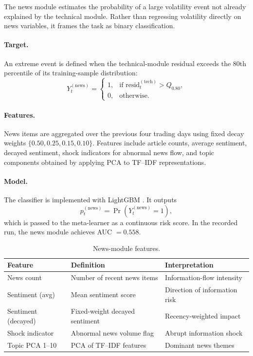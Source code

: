 \documentclass[review]{elsarticle}
\begin{document}
The news module estimates the probability of a large volatility event not already explained by the technical module. Rather than regressing volatility directly on news variables, it frames the task as binary classification.

\paragraph{Target.}
An extreme event is defined when the technical-module residual exceeds the 80th percentile of its training-sample distribution:
\begin{equation}\label{eq:news-target}
Y_t^{(\text{news})} =
\begin{cases}
1, & \text{if } \text{resid}_{t}^{(\text{tech})} > Q_{0.80}, \\
0, & \text{otherwise}.
\end{cases}
\end{equation}

\paragraph{Features.}
News items are aggregated over the previous four trading days using fixed decay weights $\{0.50,0.25,0.15,0.10\}$. Features include article counts, average sentiment, decayed sentiment, shock indicators for abnormal news flow, and topic components obtained by applying PCA to TF--IDF representations.

\paragraph{Model.}
The classifier is implemented with LightGBM \cite{ke2017}. It outputs
\[
p_t^{(\text{news})} = \Pr\!\left(Y_t^{(\text{news})}=1\right),
\]
which is passed to the meta-learner as a continuous risk score. In the recorded run, the news module achieves AUC $=0.558$.

\begin{table}[t]
\centering
\caption{News-module features.}
\label{tab:news-features}
\begin{tabular}{lll}
\hline
Feature & Definition & Interpretation \\\hline
News count & Number of recent news items & Information-flow intensity \\
Sentiment (avg) & Mean sentiment score & Direction of information risk \\
Sentiment (decayed) & Fixed-weight decayed sentiment & Recency-weighted impact \\
Shock indicator & Abnormal news volume flag & Abrupt information shock \\
Topic PCA 1--10 & PCA of TF--IDF features & Dominant news themes \\\hline
\end{tabular}
\end{table}
\end{document}
